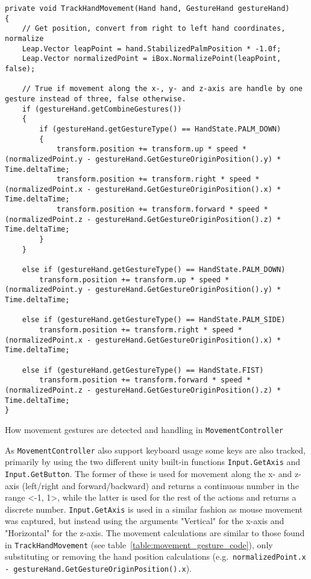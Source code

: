 \begin{table}
\label{table:movement_gesture_code}
\lstset{style=csharp}
\begin{lstlisting}
private void TrackHandMovement(Hand hand, GestureHand gestureHand)
{
    // Get position, convert from right to left hand coordinates, normalize
    Leap.Vector leapPoint = hand.StabilizedPalmPosition * -1.0f;
    Leap.Vector normalizedPoint = iBox.NormalizePoint(leapPoint, false);

    // True if movement along the x-, y- and z-axis are handle by one gesture instead of three, false otherwise.
    if (gestureHand.getCombineGestures()) 
    {
        if (gestureHand.getGestureType() == HandState.PALM_DOWN)
        {
            transform.position += transform.up * speed * (normalizedPoint.y - gestureHand.GetGestureOriginPosition().y) * Time.deltaTime;
            transform.position += transform.right * speed * (normalizedPoint.x - gestureHand.GetGestureOriginPosition().x) * Time.deltaTime;
            transform.position += transform.forward * speed * (normalizedPoint.z - gestureHand.GetGestureOriginPosition().z) * Time.deltaTime;
        }      
    }

    else if (gestureHand.getGestureType() == HandState.PALM_DOWN)
        transform.position += transform.up * speed * (normalizedPoint.y - gestureHand.GetGestureOriginPosition().y) * Time.deltaTime;

    else if (gestureHand.getGestureType() == HandState.PALM_SIDE)
        transform.position += transform.right * speed * (normalizedPoint.x - gestureHand.GetGestureOriginPosition().x) * Time.deltaTime;

    else if (gestureHand.getGestureType() == HandState.FIST)
        transform.position += transform.forward * speed * (normalizedPoint.z - gestureHand.GetGestureOriginPosition().z) * Time.deltaTime;
}                                                                              
\end{lstlisting}
\caption[How movement gestures are detected and handling in \texttt{MovementController}]{How movement gestures are detected and handling in \texttt{MovementController}} 
\end{table}

As \texttt{MovementController} also support keyboard usage some keys are also tracked, primarily by using the two different unity built-in functions \texttt{Input.GetAxis} 
and \texttt{Input.GetButton}. The former of these is used for movement along the x- and z-axis (left/right and forward/backward) and returns a continuous number in the 
range <-1, 1>, while the latter is used for the rest of the actions and returns a discrete number. 
\texttt{Input.GetAxis} is used in a similar fashion as mouse movement was captured, but instead using the arguments "Vertical" for the x-axis and "Horizontal" for the z-axis. 
The movement calculations are similar to those found in \texttt{TrackHandMovement} (see table~\vref{table:movement_gesture_code}), only substituting or removing the
hand position calculations (e.g.~\texttt{normalizedPoint.x - gestureHand.GetGestureOriginPosition().x}). 

